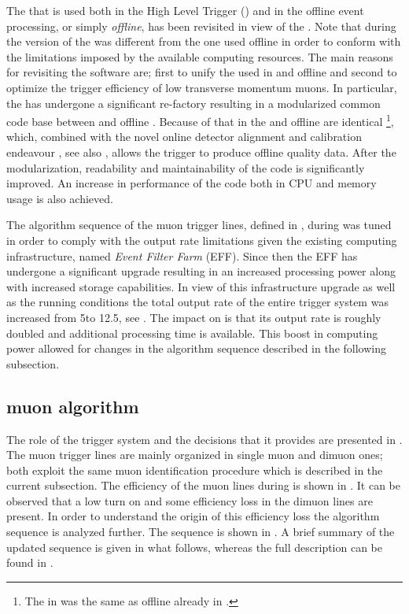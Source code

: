
The \muonID \cite{LHCb-PUB-2009-013,LHCb-PUB-2010-002} that is used both in the High Level Trigger (\hlt) \cite{LHCb-PUB-2011-017}
and in the offline event processing, or simply {\it offline}, has been revisited in view of the \lhc \runtwo.
Note that during \runone the \hlt version of the \muonID was different from the one used offline in order
to conform with the limitations imposed by the available computing resources. The main reasons for revisiting
the software are; first to unify the \muonID used in \hlt and offline and second to optimize
the trigger efficiency of low transverse momentum muons.
In particular, the \muonID has undergone a significant re-factory resulting in a modularized common code base
between \hlt and offline \cite{kevinThesis}. Because of that \muonID in the \hltone and offline
are identical \footnote{The \muonID in \hlttwo was the same as offline already in \runone.},
which, combined with the novel online detector alignment and calibration endeavour \cite{Aaij:2016rxn}, see also ,
allows the trigger to produce offline quality data. After the modularization, readability and maintainability
of the code is significantly improved. An increase in performance of the \muonID code both in CPU and memory usage
is also achieved.

The algorithm sequence of the \hltone muon trigger lines, defined in ,
during \runone was tuned in order to comply with the output rate limitations given the existing computing infrastructure,
named {\it Event Filter Farm} (EFF). Since then the EFF has undergone a significant upgrade resulting in an
increased processing power along with increased storage capabilities. In view of this infrastructure upgrade
as well as the \runtwo \lhc running conditions the total output rate of the entire trigger system was increased
from 5\khz to 12.5\khz, see . The impact on \hltone is that its output rate is
roughly doubled and additional processing time is available. This boost in computing power allowed for changes
in the \muonID algorithm sequence described in the following subsection.

\subsection{\hltone muon algorithm}
\label{hlt1run2}

The role of the trigger system and the decisions that it provides are presented in .
The \hltone muon trigger lines are mainly organized in single muon and dimuon ones; both exploit the same
muon identification procedure which is described in the current subsection.
The efficiency of the muon lines during \runone is shown in .
It can be observed that a low \pt turn on and some efficiency loss in the dimuon lines are present.
In order to understand the origin of this efficiency loss the \hltone algorithm sequence \cite{LHCb-PUB-2011-017}
is analyzed further. The sequence is shown  in . A brief summary of the
updated sequence is given in what follows, whereas the full description can be found in \cite{kevinThesis}.

